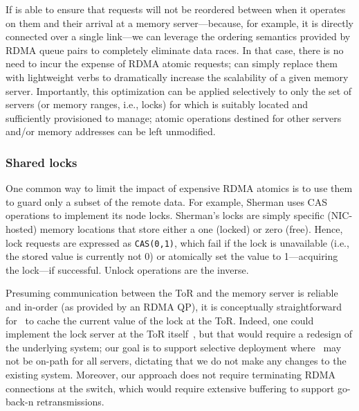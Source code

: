 If {\sword} is able to ensure that requests will not be reordered between when
it operates on them and their arrival at a memory server---because, for example,
it is directly connected over a single link---we can leverage the ordering
semantics provided by RDMA queue pairs to completely eliminate data races.
In that case, there is no need to incur the expense of RDMA atomic
requests; {\sword} can simply replace them with lightweight verbs to
dramatically increase the scalability of a given memory server.
Importantly, this optimization can be applied selectively to only the
set of servers (or memory ranges, i.e., locks) for which {\sword} is
suitably located and sufficiently provisioned to manage; atomic
operations destined for other servers and/or memory addresses can be
left unmodified.

\subsubsection{Shared locks}
\label{sec:locking-algorithm}

One common way to limit the impact of expensive RDMA atomics is to use
them to guard only a subset of the remote data.  For example, Sherman
uses CAS operations to implement its node locks.
%
Sherman's locks are simply specific (NIC-hosted) memory locations
that store either a one (locked) or zero (free).  Hence, lock requests
are expressed as \texttt{CAS(0,1)}, which fail if the lock is
unavailable (i.e., the stored value is currently not 0) or atomically
set the value to 1---acquiring the lock---if successful. Unlock
operations are the inverse.

Presuming communication between the ToR and the memory server is
reliable and in-order (as provided by an RDMA QP), it is conceptually
straightforward for \sword\ to cache the current value of the lock at
the ToR.  Indeed, one could implement the lock server at the ToR
itself~\cite{netlock}, but that would require a redesign of the
underlying system; our goal is to support selective deployment where
\sword\ may not be on-path for all servers, dictating that we do not
make any changes to the existing system.  Moreover, our approach does
not require terminating RDMA connections at the switch, which would
require extensive buffering to support go-back-n retransmissions.

